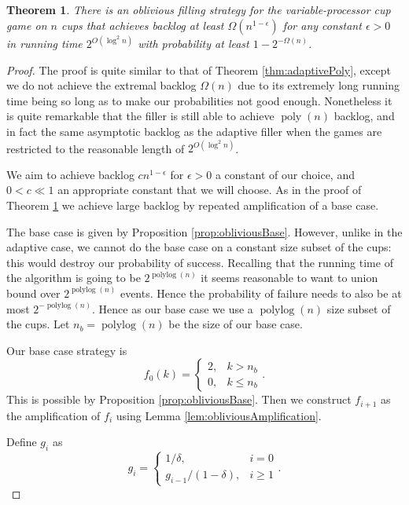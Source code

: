 \documentclass[twocolumn]{article}[10pt]
\DeclareMathOperator{\polylog}{\text{polylog}}
\DeclareMathOperator{\poly}{\text{poly}}
\newtheorem{theorem}{Theorem}
\begin{document}
\begin{theorem}
  \label{thm:obliviousPoly}
  There is an oblivious filling strategy for the variable-processor cup game on
  $n$ cups that achieves backlog at least $\Omega(n^{1-\epsilon})$ for any
  constant $\epsilon >0$ in running time $2^{O(\log^2 n)}$ with probability at least $1-2^{-\Omega(n)}$.
\end{theorem}
\begin{proof}
  The proof is quite similar to that of Theorem \ref{thm:adaptivePoly},
  except we do not achieve the extremal backlog $\Omega(n)$ due to its
  extremely long running time being so long as to make our probabilities not
  good enough. Nonetheless it is quite remarkable that the filler is still able to 
  achieve $\poly(n)$ backlog, and in fact the same asymptotic backlog as the
  adaptive filler when the games are restricted to the reasonable length of
  $2^{O(\log^2 n)}$.

  We aim to achieve backlog $cn^{1-\epsilon}$ for $\epsilon >  0$ a constant of
  our choice, and $0< c \ll 1$ an appropriate constant that we will choose.
  As in the proof of Theorem \ref{thm:obliviousPoly} we achieve large backlog
  by repeated amplification of a base case. 

  The base case is given by Proposition \ref{prop:obliviousBase}. However,
  unlike in the adaptive case, we cannot do the base case on a constant size
  subset of the cups: this would destroy our probability of success. Recalling
  that the running time of the algorithm is going to be $2^{\polylog(n)}$ it
  seems reasonable to want to union bound over $2^{\polylog(n)}$ events. Hence
  the probability of failure needs to also be at most $2^{-\polylog(n)}$.
  Hence as our base case we use a $\polylog(n)$ size subset of the cups. 
  Let $n_b = \polylog(n)$ be the size of our base case.

  Our base case strategy is 
  $$
  f_0(k)=
  \begin{cases}
    2, & k > n_b\\
    0, & k \le n_b
  \end{cases}.$$
  This is possible by Proposition \ref{prop:obliviousBase}.
  Then we construct $f_{i+1}$ as the amplification of $f_i$ using Lemma \ref{lem:obliviousAmplification}.

  Define $g_i$ as 
  $$
  g_i =
  \begin{cases}
    1/\delta, & i=0\\
    g_{i-1}/(1-\delta), & i\ge 1 
  \end{cases}.$$


\end{proof}
\end{document}
